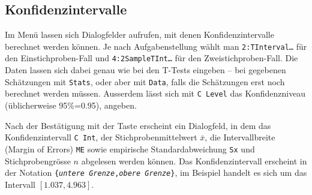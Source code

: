 \documentclass[a4paper,11pt,notitlepage,halfparskip,headsepline,normalheadings,twoside]{scrartcl}
\newlength{\tikey}
\newcommand{\keystroke}[1]{\settowidth{\tikey}{\scriptsize #1}\psframebox[framearc=0.2]{\parbox{\tikey}{\scriptsize\textsf{#1}}}}
\begin{document}
\subsection{Konfidenzintervalle}
\begin{window}
Im Menü \keystroke{F7} lassen sich Dialogfelder aufrufen, mit denen 
Konfidenzintervalle berechnet werden können. Je nach Aufgabenstellung wählt man
\texttt{2:TInterval\ldots} für den Einstichproben-Fall und
\texttt{4:2SampleTInt\ldots} für den Zweistichproben-Fall. Die Daten lassen sich
dabei genau wie bei den T-Tests eingeben -- bei gegebenen Schätzungen mit
\texttt{Stats}, oder aber mit \texttt{Data}, falls die Schätzungen erst noch
berechnet werden müssen. Ausserdem lässt sich mit \texttt{C Level} das
Konfidenzniveau (üblicherweise 95\%=0.95), angeben.
\end{window}

\begin{window}
Nach der Bestätigung mit der Taste \keystroke{ENTER} erscheint ein Dialogfeld,
in dem das Konfidenzintervall \texttt{C Int}, der Stichprobenmittelwert
$\bar{x}$, die Intervallbreite (Margin of Errors) \texttt{ME} sowie empirische
Standardabweichung \texttt{Sx} und Stichprobengrösse $n$ abgelesen werden
können. Das Konfidenzintervall erscheint in der Notation
\texttt{\{\textit{untere Grenze},\textit{obere Grenze}\}}, im Beispiel handelt
es sich um das Intervall $[1.037, 4.963]$.
\end{window}
\end{document}
